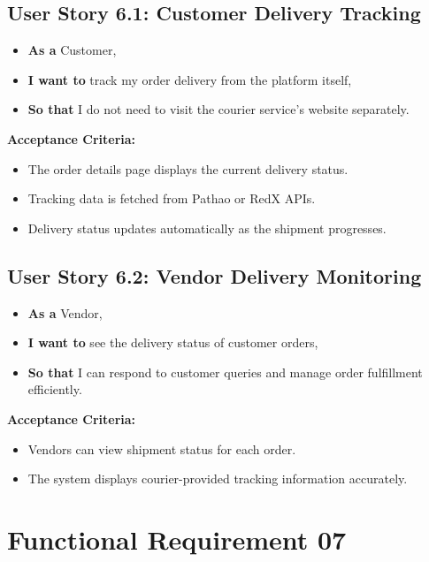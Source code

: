 \subsection*{User Story 6.1: Customer Delivery Tracking}
\begin{itemize}
    \item \textbf{As a} Customer,
    \item \textbf{I want to} track my order delivery from the platform itself,
    \item \textbf{So that} I do not need to visit the courier service's website separately.
\end{itemize}

\noindent\textbf{Acceptance Criteria:}
\begin{itemize}
    \item The order details page displays the current delivery status.
    \item Tracking data is fetched from Pathao or RedX APIs.
    \item Delivery status updates automatically as the shipment progresses.
\end{itemize}

\vspace{1.5em}
\subsection*{User Story 6.2: Vendor Delivery Monitoring}
\begin{itemize}
    \item \textbf{As a} Vendor,
    \item \textbf{I want to} see the delivery status of customer orders,
    \item \textbf{So that} I can respond to customer queries and manage order fulfillment efficiently.
\end{itemize}

\noindent\textbf{Acceptance Criteria:}
\begin{itemize}
    \item Vendors can view shipment status for each order.
    \item The system displays courier-provided tracking information accurately.
\end{itemize}







\section{Functional Requirement 07}

